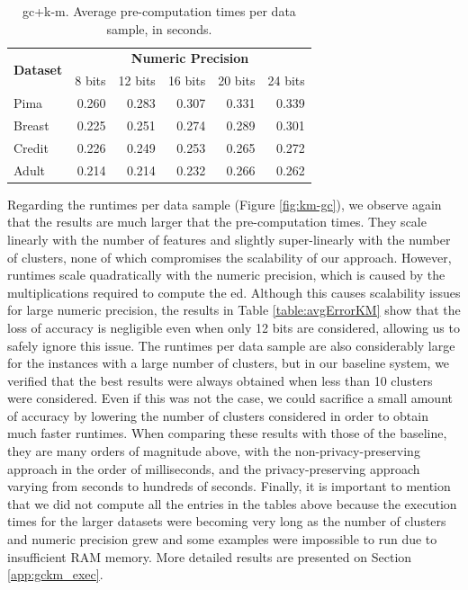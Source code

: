 \begin{table}[htp]
\centering
\caption{\acs{gc}+\acs{k-m}. Average pre-computation times per data sample, in seconds.}
\label{table:avgKMAllDatasets}
\vspace*{0.2cm}
\begin{tabular}{|l|r|r|r|r|r|}
\hline
\multirow{2}{*}{\textbf{Dataset}} & \multicolumn{5}{c|}{\textbf{Numeric Precision}}                                             \\ \cline{2-6} 
                                  & 8 bits & 12 bits & 16 bits & 20 bits & 24 bits \\ \hline
Pima                              & 0.260           & 0.283            & 0.307            & 0.331            & 0.339            \\ \hline
Breast                            & 0.225           & 0.251            & 0.274            & 0.289            & 0.301            \\ \hline
Credit                            & 0.226           & 0.249            & 0.253            & 0.265            & 0.272            \\ \hline
Adult                             & 0.214           & 0.214            & 0.232            & 0.266            & 0.262            \\ \hline
\end{tabular}
\end{table}

Regarding the runtimes per data sample (Figure \ref{fig:km-gc}), we observe again that the results are much larger that the pre-computation times. They scale linearly with the number of features and slightly super-linearly with the number of clusters, none of which compromises the scalability of our approach. However, runtimes scale quadratically with the numeric precision, which is caused by the multiplications required to compute the \ac{ed}. Although this causes scalability issues for large numeric precision, the results in Table \ref{table:avgErrorKM} show that the loss of accuracy is negligible even when only 12 bits are considered, allowing us to safely ignore this issue. The runtimes per data sample are also considerably large for the instances with a large number of clusters, but in our baseline system, we verified that the best results were always obtained when less than 10 clusters were considered. Even if this was not the case, we could sacrifice a small amount of accuracy by lowering the number of clusters considered in order to obtain much faster runtimes. When comparing these results with those of the baseline, they are many orders of magnitude above, with the non-privacy-preserving approach in the order of milliseconds, and the privacy-preserving approach varying from seconds to hundreds of seconds. Finally, it is important to mention that we did not compute all the entries in the tables above because the execution times for the larger datasets were becoming very long as the number of clusters and numeric precision grew and some examples were impossible to run due to insufficient RAM memory. More detailed results are presented on Section \ref{app:gckm_exec}.

